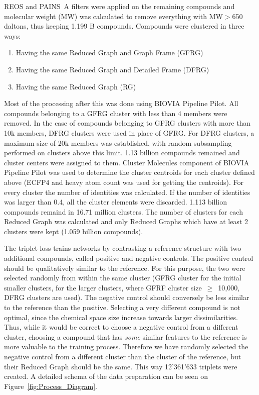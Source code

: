 \documentclass[journal=jacsat,manuscript=article]{achemso}
\begin{document}
REOS\cite{Walters1998} and PAINS~A\cite{Baell2010} filters were applied on the remaining compounds and molecular weight (MW) was calculated to remove everything with MW$>$650 daltons, thus keeping 1.199 B compounds. Compounds were clustered in three ways:
\begin{enumerate}
\item Having the same Reduced Graph and Graph Frame (GFRG)
\item Having the same Reduced Graph and Detailed Frame (DFRG)
\item  Having the same Reduced Graph (RG)
\end{enumerate}
Most of the processing after this was done using BIOVIA Pipeline Pilot\cite{biovia2020}. All compounds belonging to a GFRG cluster with less than 4 members were removed. In the case of compounds belonging to GFRG clusters with more than 10k members, DFRG clusters were used in place of GFRG. For DFRG clusters, a maximum size of 20k members was established, with random subsampling performed on clusters above this limit. 1.13 billion compounds remained and cluster centers were assigned to them. Cluster Molecules component of BIOVIA Pipeline Pilot\cite{biovia2020} was used to determine the cluster centroids for each cluster defined above (ECFP4 and heavy atom count was used for getting the centroids). For every cluster the number of identities was calculated. If the number of identities was larger than 0.4, all the cluster elements were discarded. 1.113 billion compounds remaind in 16.71 million clusters. The number of clusters for each Reduced Graph was calculated and only Reduced Graphs which have at least 2 clusters were kept (1.059 billion compounds).

The triplet loss trains networks by contrasting a reference structure with two additional compounds, called positive and negative controls. The positive control should be qualitatively similar to the reference. For this purpose, the two were selected randomly from within the same cluster (GFRG cluster for the initial smaller clusters, for the larger clusters, where GFRF cluster size~$\geq$~10,000, DFRG clusters are used). The negative control should conversely be less similar to the reference than the positive. Selecting a very different compound is not optimal, since the chemical space size increase towards larger dissimilarities. Thus, while it would be correct to choose a negative control from a different cluster, choosing a compound that has \textit{some} similar features to the reference is more valuable to the training process. Therefore we have randomly selected the negative control from a different cluster than the cluster of the reference, but their Reduced Graph should be the same. This way 12'361'633 triplets were created. A detailed schema of the data preparation can be seen on Figure~\ref{fig:Process_Diagram}.
\end{document}
